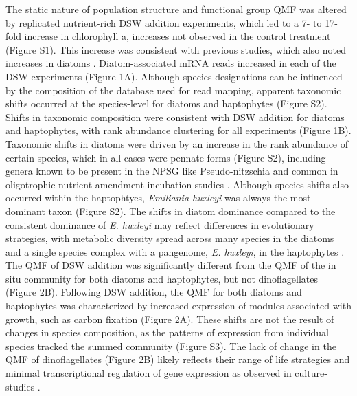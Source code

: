 The static nature of population structure and functional group QMF was altered by replicated nutrient-rich DSW addition experiments, which led to a 7- to 17-fold increase in chlorophyll a, increases not observed in the control treatment (Figure S1). This increase was consistent with previous studies, which also noted increases in diatoms \citep{McAndrew2007}. Diatom-associated mRNA reads increased in each of the DSW experiments (Figure 1A). Although species designations can be influenced by the composition of the database used for read mapping, apparent taxonomic shifts occurred at the species-level for diatoms and haptophytes (Figure S2). Shifts in taxonomic composition were consistent with DSW addition for diatoms and haptophytes, with rank abundance clustering for all experiments (Figure 1B).  Taxonomic shifts in diatoms were driven by an increase in the rank abundance of certain species, which in all cases were pennate forms (Figure S2), including genera known to be present in the NPSG like Pseudo-nitzschia \citep{Silver2010} and common in oligotrophic nutrient amendment incubation studies \citep{Marchetti2005, Marchetti2012a}. Although species shifts also occurred within the haptophtyes, \textit{Emiliania huxleyi} was always the most dominant taxon (Figure S2). The shifts in diatom dominance compared to the consistent dominance of \textit{E. huxleyi} may reflect differences in evolutionary strategies, with metabolic diversity spread across many species in the diatoms and a single species complex with a pangenome, \textit{E. huxleyi}, in the haptophytes \citep{Read2013}. The QMF of DSW addition was significantly different from the QMF of the in situ community for both diatoms and haptophytes, but not dinoflagellates (Figure 2B). Following DSW addition, the QMF for both diatoms and haptophytes was characterized by increased expression of modules associated with growth, such as carbon fixation (Figure 2A). These shifts are not the result of changes in species composition, as the patterns of expression from individual species tracked the summed community (Figure S3). The lack of change in the QMF of dinoflagellates (Figure 2B) likely reflects their range of life strategies \citep{Hackett2004} and minimal transcriptional regulation of gene expression as observed in culture-studies \citep{Moustafa2010}. \par
